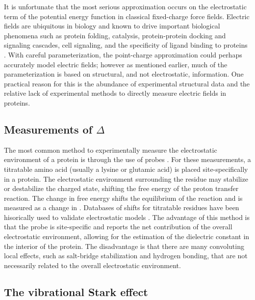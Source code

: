 It is unfortunate that the most serious approximation occurs on the electrostatic term of the potential energy function in classical fixed-charge force fields. 
Electric fields are ubiquitous in biology and known to drive important biological phenomena such as protein folding, catalysis, protein-protein docking and signaling cascades, cell signaling, and the specificity of ligand binding to proteins \cite{Hayes1976, Warshel1978, Honig1995, Gunner1996, Warshel1998}. 
With careful parameterization, the point-charge approximation could perhaps accurately model electric fields; 
however as mentioned earlier, much of the parameterization is based on structural, and not electrostatic, information. 
One practical reason for this is the abundance of experimental structural data and the relative lack of experimental methods to directly measure electric fields in proteins. 

\subsection{Measurements of $\Delta$\pKa{}}

The most common method to experimentally measure the electrostatic environment of a protein is through the use of \pKa{} probes \cite{Bradbury1966, Forsyth2002, Isom2010, Langsetmo1991, Markley1975}. 
For these measurements, a titratable amino acid (usually a lysine or glutamic acid) is placed site-specifically in a protein. 
The electrostatic environment surrounding the residue may stabilize or destabilize the charged state, shifting the free energy of the proton transfer reaction. 
The change in free energy shifts the equilibrium of the reaction and is measured as a change in \pKa{}.
Databases of \pKa{} shifts for titratable residues have been hisorically used to validate electrostatic models \cite{Gibas1996, Antosiewicz1996, Fogolari2002, Li2005, Witham2011, Meyer2015, Mehler1999, Nielsen2011}. 
The advantage of this method is that the probe is site-specific and reports the net contribution of the overall electrostatic environment, allowing for the estimation of the dielectric constant in the interior of the protein. 
The disadvantage is that there are many convoluting local effects, such as salt-bridge stabilization and hydrogen bonding, that are not necessarily related to the overall electrostatic environment. 

\subsection{The vibrational Stark effect}

